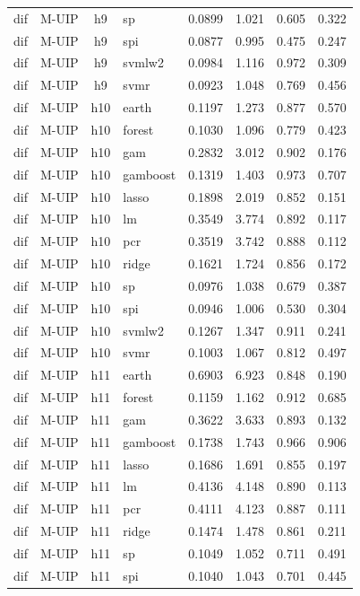\begin{ThreePartTable}
\begin{longtable}[t]{llclcccc}
dif & M-UIP & h9 & sp & 0.0899 & 1.021 & 0.605 & 0.322\\
dif & M-UIP & h9 & spi & 0.0877 & 0.995 & 0.475 & 0.247\\
dif & M-UIP & h9 & svmlw2 & 0.0984 & 1.116 & 0.972 & 0.309\\
dif & M-UIP & h9 & svmr & 0.0923 & 1.048 & 0.769 & 0.456\\
\addlinespace
dif & M-UIP & h10 & earth & 0.1197 & 1.273 & 0.877 & 0.570\\
dif & M-UIP & h10 & forest & 0.1030 & 1.096 & 0.779 & 0.423\\
dif & M-UIP & h10 & gam & 0.2832 & 3.012 & 0.902 & 0.176\\
dif & M-UIP & h10 & gamboost & 0.1319 & 1.403 & 0.973 & 0.707\\
dif & M-UIP & h10 & lasso & 0.1898 & 2.019 & 0.852 & 0.151\\
dif & M-UIP & h10 & lm & 0.3549 & 3.774 & 0.892 & 0.117\\
dif & M-UIP & h10 & pcr & 0.3519 & 3.742 & 0.888 & 0.112\\
dif & M-UIP & h10 & ridge & 0.1621 & 1.724 & 0.856 & 0.172\\
dif & M-UIP & h10 & sp & 0.0976 & 1.038 & 0.679 & 0.387\\
dif & M-UIP & h10 & spi & 0.0946 & 1.006 & 0.530 & 0.304\\
dif & M-UIP & h10 & svmlw2 & 0.1267 & 1.347 & 0.911 & 0.241\\
dif & M-UIP & h10 & svmr & 0.1003 & 1.067 & 0.812 & 0.497\\
\addlinespace
dif & M-UIP & h11 & earth & 0.6903 & 6.923 & 0.848 & 0.190\\
dif & M-UIP & h11 & forest & 0.1159 & 1.162 & 0.912 & 0.685\\
dif & M-UIP & h11 & gam & 0.3622 & 3.633 & 0.893 & 0.132\\
dif & M-UIP & h11 & gamboost & 0.1738 & 1.743 & 0.966 & 0.906\\
dif & M-UIP & h11 & lasso & 0.1686 & 1.691 & 0.855 & 0.197\\
dif & M-UIP & h11 & lm & 0.4136 & 4.148 & 0.890 & 0.113\\
dif & M-UIP & h11 & pcr & 0.4111 & 4.123 & 0.887 & 0.111\\
dif & M-UIP & h11 & ridge & 0.1474 & 1.478 & 0.861 & 0.211\\
dif & M-UIP & h11 & sp & 0.1049 & 1.052 & 0.711 & 0.491\\
dif & M-UIP & h11 & spi & 0.1040 & 1.043 & 0.701 & 0.445\\

\end{longtable}
\end{ThreePartTable}
